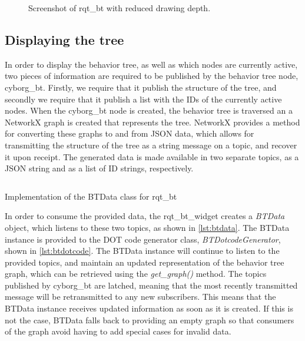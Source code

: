 \documentclass[\rootfolder/main.tex]{subfiles}
\begin{document}
\begin{figure}[ht]
    \caption{Screenshot of rqt\_bt with reduced drawing depth.}
    \label{fig:rqt-bt-depth}
\end{figure}

\subsection{Displaying the tree}

In order to display the behavior tree, as well as which nodes are currently active, two pieces of information are required to be published by the behavior tree node, cyborg\_bt.
Firstly, we require that it publish the structure of the tree, and secondly we require that it publish a list with the IDs of the currently active nodes.
When the cyborg\_bt node is created, the behavior tree is traversed an a NetworkX graph is created that represents the tree.
NetworkX provides a method for converting these graphs to and from JSON data, which allows for transmitting the structure of the tree as a string message on a topic, and recover it upon receipt.
The generated data is made available in two separate topics, as a JSON string and as a list of ID strings, respectively.

\begin{listing}
    \inputminted{Python}{\rootfolder/Chapters/Chapter4/Listings/btdata.py}
    \caption{Implementation of the BTData class for rqt\_bt}
    \label{lst:btdata}
\end{listing}

In order to consume the provided data, the rqt\_bt\_widget creates a \emph{BTData} object, which listens to these two topics, as shown in \cref{lst:btdata}.
The BTData instance is provided to the DOT code generator class, \emph{BTDotcodeGenerator}, shown in \cref{lst:btdotcode}.
The BTData instance will continue to listen to the provided topics, and maintain an updated representation of the behavior tree graph, which can be retrieved using the \emph{get\_graph()} method.
The topics published by cyborg\_bt are latched, meaning that the most recently transmitted message will be retransmitted to any new subscribers.
This means that the BTData instance receives updated information as soon as it is created.
If this is not the case, BTData falls back to providing an empty graph so that consumers of the graph avoid having to add special cases for invalid data.
\end{document}
